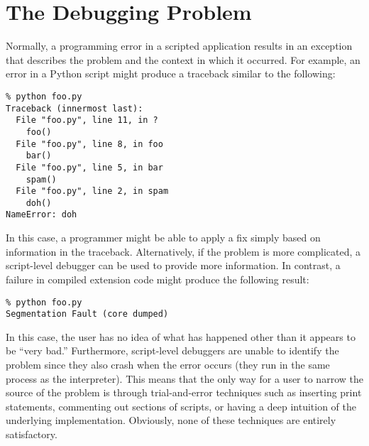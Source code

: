 \section{The Debugging Problem}

Normally, a programming error in a scripted application 
results in an exception that describes the problem and the context in
which it occurred.  For example, an error in a Python script might
produce a traceback similar to the following:

\begin{verbatim}
% python foo.py
Traceback (innermost last):
  File "foo.py", line 11, in ?
    foo()
  File "foo.py", line 8, in foo
    bar()
  File "foo.py", line 5, in bar
    spam()
  File "foo.py", line 2, in spam
    doh()
NameError: doh
\end{verbatim}

In this case, a programmer might be able to apply a fix simply based
on information in the traceback.  Alternatively, if the problem is
more complicated, a script-level debugger can be used to provide more
information.  In contrast, a failure in compiled extension code might
produce the following result:

\begin{verbatim}
% python foo.py
Segmentation Fault (core dumped)
\end{verbatim}

In this case, the user has no idea of what has happened other than it
appears to be ``very bad.''  Furthermore, script-level debuggers are
unable to identify the problem since they also crash when the error
occurs (they run in the same process as the interpreter).  This means
that the only way for a user to narrow the source of the problem is
through trial-and-error techniques such as inserting print statements,
commenting out sections of scripts, or having a deep intuition of the
underlying implementation. Obviously, none of these techniques are
entirely satisfactory.

